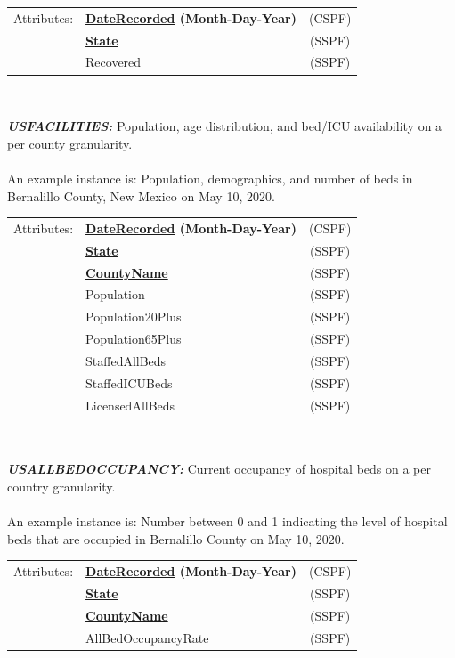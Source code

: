 \documentclass[11pt]{article}
\begin{document}
\begin{description}
\begin{tabular}{llc}
 Attributes: & {\bf \underline{DateRecorded} (Month-Day-Year)} &  (CSPF) \\
	    & {\bf \underline{State}} &  (SSPF) \\
	    & Recovered & (SSPF) \\
\end{tabular} \\

\item{\em\bf USFACILITIES:} Population, age distribution, and bed/ICU availability on a per county granularity. \\ \\

An example instance is: Population, demographics, and number of beds in Bernalillo County, New Mexico on May 10, 2020. \\
 
\begin{tabular}{llc}
 Attributes: & {\bf \underline{DateRecorded} (Month-Day-Year)} &  (CSPF) \\
	    & {\bf \underline{State}} &  (SSPF) \\
	    & {\bf \underline{CountyName}} & (SSPF) \\
	    & Population & (SSPF) \\
	    & Population20Plus & (SSPF) \\
	    & Population65Plus & (SSPF) \\
	    & StaffedAllBeds & (SSPF) \\
	    & StaffedICUBeds & (SSPF) \\
	    & LicensedAllBeds & (SSPF) \\
\end{tabular} \\

\item{\em\bf USALLBEDOCCUPANCY:} Current occupancy of hospital beds on a per country granularity. \\ \\

An example instance is: Number between 0 and 1 indicating the level of hospital beds that are occupied in Bernalillo County on May 10, 2020. \\
 
\begin{tabular}{llc}
 Attributes: & {\bf \underline{DateRecorded} (Month-Day-Year)} &  (CSPF) \\
	    & {\bf \underline{State}} &  (SSPF) \\
	    & {\bf \underline{CountyName}} & (SSPF) \\
	    & AllBedOccupancyRate & (SSPF) \\
\end{tabular} \\


\end{description}
\end{document}
